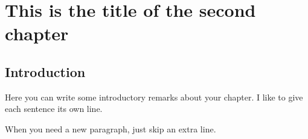	\chapter{This is the title of the second chapter}
	\newpage


\section{Introduction}

Here you can write some introductory remarks about your chapter.
I like to give each sentence its own line.

When you need a new paragraph, just skip an extra line.


\begin{comment}
	
	{}

	
\end{comment}
